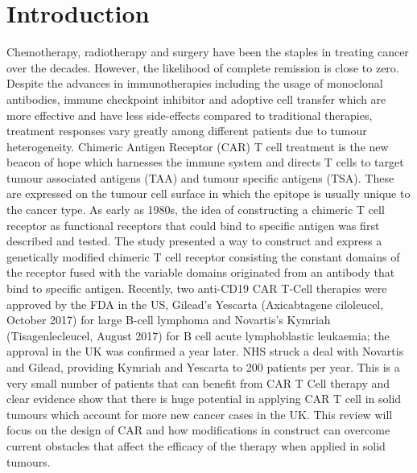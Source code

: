 \documentclass[12pt,oneside]{report}
\begin{document}
\section{Introduction} 
Chemotherapy, radiotherapy and surgery have been the staples in treating cancer over the decades. However, the likelihood of complete remission is close to zero. Despite the advances in immunotherapies including the usage of monoclonal antibodies, immune checkpoint inhibitor and adoptive cell transfer which are more effective and have less side-effects compared to traditional therapies, treatment responses vary greatly among different patients due to tumour heterogeneity. Chimeric Antigen Receptor (CAR) T cell treatment is the new beacon of hope which harnesses the immune system and directs T cells to target tumour associated antigens (TAA) and tumour specific antigens (TSA). These are expressed on the tumour cell surface in which the epitope is usually unique to the cancer type. As early as 1980s, the idea of constructing a chimeric T cell receptor as functional receptors that could bind to specific antigen was first described\citep{first, KUWANA1987960} and tested. The study presented a way to construct and express a genetically modified chimeric T cell receptor consisting the constant domains of the receptor fused with the variable domains originated from an antibody that bind to specific antigen. Recently, two anti-CD19 CAR T-Cell therapies were approved by the FDA in the US, Gilead's Yescarta (Axicabtagene ciloleucel, October 2017) for large B-cell lymphoma and Novartis's Kymriah (Tisagenlecleucel, August 2017) for B cell acute lymphoblastic leukaemia; the approval in the UK was confirmed a year later. NHS struck a deal with Novartis and Gilead, providing Kymriah\citep{Kymriah} and Yescarta\citep{Yescarta} to 200 patients per year. This is a very small number of patients that can benefit from CAR T Cell therapy and clear evidence show that there is huge potential in applying CAR T cell in solid tumours which account for more new cancer cases in the UK\citep{CRUK}. This review will focus on the design of CAR and how modifications in construct can overcome current obstacles that affect the efficacy of the therapy when applied in solid tumours.
\end{document}
